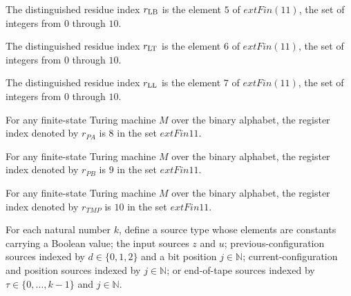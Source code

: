 \begin{definition}
\label{Complexity.UTab.rLB}
\leanok
The distinguished residue index $r_{\rm LB}$ is the element $5$ of $	ext{Fin}(11)$, the
set of integers from $0$ through $10$.
\end{definition}

\begin{definition}
\label{Complexity.UTab.rLT}
\leanok
The distinguished residue index $r_{\rm LT}$ is the element $6$ of $	ext{Fin}(11)$, the
set of integers from $0$ through $10$.
\end{definition}

\begin{definition}
\label{Complexity.UTab.rLL}
\leanok
The distinguished residue index $r_{\rm LL}$ is the element $7$ of $	ext{Fin}(11)$, the
set of integers from $0$ through $10$.
\end{definition}

\begin{definition}
\label{Complexity.UTab.rPA}
\leanok
For any finite-state Turing machine $M$ over the binary alphabet, the register index
denoted by $r_{PA}$ is $8$ in the set $	ext{Fin }11$.
\end{definition}

\begin{definition}
\label{Complexity.UTab.rPB}
\leanok
For any finite-state Turing machine $M$ over the binary alphabet, the register index
denoted by $r_{PB}$ is $9$ in the set $	ext{Fin }11$.
\end{definition}

\begin{definition}
\label{Complexity.UTab.rTMP}
\leanok
For any finite-state Turing machine $M$ over the binary alphabet, the register index
denoted by $r_{TMP}$ is $10$ in the set $	ext{Fin }11$.
\end{definition}

\begin{definition}
\label{Complexity.UTab.SSrc}
\leanok
For each natural number $k$, define a source type whose elements are constants carrying
a Boolean value; the input sources $z$ and $u$; previous-configuration sources indexed
by $d\in\{0,1,2\}$ and a bit position $j\in\mathbb N$; current-configuration and
position sources indexed by $j\in\mathbb N$; or end-of-tape sources indexed by
$\tau\in\{0,\ldots,k-1\}$ and $j\in\mathbb N$.
\end{definition}


